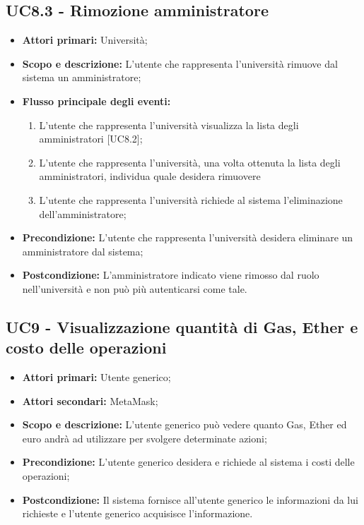 \documentclass[AnalisiDeiRequisiti.tex]{subfiles}
\begin{document}
\subsection{UC8.3 - Rimozione amministratore}
\begin{itemize}
	\item \textbf{Attori primari:} Università;\\
	\item \textbf{Scopo e descrizione:} L'utente che rappresenta l'università rimuove dal sistema un amministratore;\\
	\item \textbf{Flusso principale degli eventi:}\\
	\begin{enumerate}
		\item L'utente che rappresenta l'università  visualizza la lista degli amministratori [UC8.2];
		\item L'utente che rappresenta l'università, una volta ottenuta la lista degli amministratori, individua quale desidera rimuovere\\
		\item L'utente che rappresenta l'università richiede al sistema l'eliminazione dell'amministratore;
	\end{enumerate}
	\item \textbf{Precondizione:} L'utente che rappresenta l'università desidera eliminare un amministratore dal sistema;\\
	\item \textbf{Postcondizione:} L'amministratore indicato viene rimosso dal ruolo nell'università e non può più autenticarsi come tale.\\
\end{itemize}

\subsection{UC9 - Visualizzazione quantità di Gas, Ether e costo delle operazioni}
\begin{itemize}
	\item \textbf{Attori primari:} Utente generico;\\
	\item \textbf{Attori secondari:} MetaMask;\\
	\item \textbf{Scopo e descrizione:} L'utente generico può vedere quanto Gas, Ether ed euro andrà ad utilizzare per svolgere determinate azioni;\\
	\item \textbf{Precondizione:} L'utente generico desidera e richiede al sistema i costi delle operazioni;\\
	\item \textbf{Postcondizione:} Il sistema fornisce all'utente generico le informazioni da lui richieste e l'utente generico acquisisce l'informazione.\\
\end{itemize}
\end{document}
